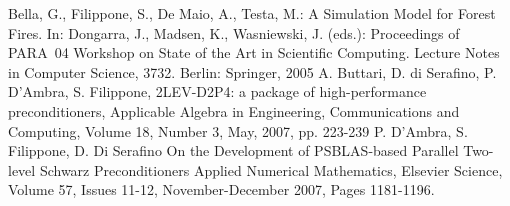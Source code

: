 \begin{thebibliography}{99}

%
Bella, G., Filippone, S., De Maio, A., Testa, M.:
A Simulation Model for Forest Fires.
In: Dongarra, J., Madsen, K., Wasniewski, J. (eds.):
Proceedings of PARA~04 Workshop on State of the Art
in Scientific Computing. Lecture Notes in Computer Science, 3732. Berlin:
Springer, 2005
%
 A. Buttari, D. di Serafino, P. D'Ambra, S. Filippone,\newblock
2LEV-D2P4: a package of high-performance preconditioners,\newblock
Applicable Algebra in Engineering, Communications and Computing, 
Volume 18, Number 3, May, 2007, pp.  223-239
%
  P. D'Ambra, S. Filippone,  D. Di Serafino\newblock
On the Development of PSBLAS-based Parallel Two-level Schwarz Preconditioners
\newblock
Applied Numerical Mathematics, Elsevier Science, 
Volume 57, Issues 11-12, November-December 2007, Pages 1181-1196.


\end{thebibliography}
